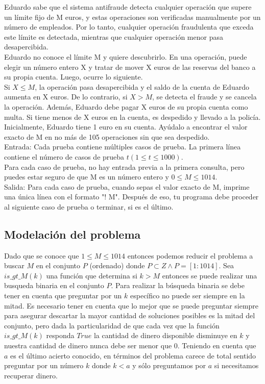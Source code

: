 \documentclass[
10pt, %
a4paper, %
oneside, %
headinclude,footinclude, %
BCOR5mm, %
]{scrartcl}
\begin{document}
Eduardo sabe que el sistema antifraude detecta cualquier operación que supere un límite fijo de M euros, y estas operaciones son verificadas manualmente por un número de empleados. Por lo tanto, cualquier operación fraudulenta que exceda este límite es detectada, mientras que cualquier operación menor pasa desapercibida.\\

Eduardo no conoce el límite M y quiere descubrirlo. En una operación, puede elegir un número entero X y tratar de mover X euros de las reservas del banco a su propia cuenta. Luego, ocurre lo siguiente.\\

Si $X \leq M$, la operación pasa desapercibida y el saldo de la cuenta de Eduardo aumenta en X euros.  
De lo contrario, si $X > M$, se detecta el fraude y se cancela la operación. Además, Eduardo debe pagar X euros de su propia cuenta como multa. Si tiene menos de X euros en la cuenta, es despedido y llevado a la policía.  
Inicialmente, Eduardo tiene 1 euro en su cuenta. Ayúdalo a encontrar el valor exacto de M en no más de 105 operaciones sin que sea despedido.\\

Entrada:
Cada prueba contiene múltiples casos de prueba. La primera línea contiene el número de casos de prueba $t (1 \leq t \leq 1000)$.\\

Para cada caso de prueba, no hay entrada previa a la primera consulta, pero puedes estar seguro de que M es un número entero y $0 \leq M \leq 1014$.\\

Salida:
Para cada caso de prueba, cuando sepas el valor exacto de M, imprime una única línea con el formato "! M". Después de eso, tu programa debe proceder al siguiente caso de prueba o terminar, si es el último.\\


\subsection{Modelación del problema}

Dado que se conoce que $1 \leq M \leq 1014$ entonces podemos reducir el problema a buscar $M$ en el conjunto $P$ (ordenado) donde $P \subset Z \wedge P = [1:1014]$. Sea $is\_ gt\_ M(k)$ una función que determina si $k > M$ entonces se puede realizar una busqueda binaria en el conjunto $P$.
Para realizar la búsqueda binaria se debe tener en cuenta que preguntar por un $k$ específico no puede ser siempre en la mitad. Es necesario tener en cuenta que lo mejor que se puede preguntar siempre para asegurar descartar la mayor cantidad de soluciones posibles es la mitad del conjunto,
pero dada la particularidad de que cada vez que la función $is\_ gt\_ M(k)$ responda $True$ la cantidad de dinero disponible disminuye en $k$ y nuestra cantidad de dinero nunca debe  ser menor que $0$.
Teniendo en cuenta que $a$ es el último acierto conocido, en términos del problema carece de total sentido preguntar por un número $k$ donde $k<a$ y sólo preguntamos por $a$ si necesitamos recuperar dinero. 
\end{document}
